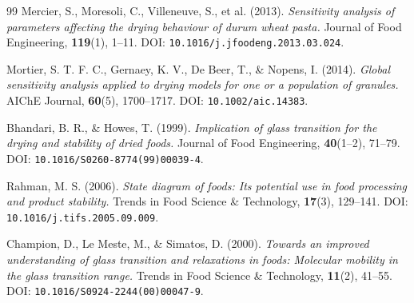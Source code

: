 \begin{thebibliography}{99}
 Mercier, S., Moresoli, C., Villeneuve, S., et al. (2013).
\emph{Sensitivity analysis of parameters affecting the drying behaviour of
durum wheat pasta.} Journal of Food Engineering, \textbf{119}(1), 1--11.
DOI: \texttt{10.1016/j.jfoodeng.2013.03.024}.

 Mortier, S. T. F. C., Gernaey, K. V., De Beer, T., \&
Nopens, I. (2014).
\emph{Global sensitivity analysis applied to drying models for one or a
population of granules.} AIChE Journal, \textbf{60}(5), 1700--1717.
DOI: \texttt{10.1002/aic.14383}.

 Bhandari, B. R., \& Howes, T. (1999).
\emph{Implication of glass transition for the drying and stability of dried
foods.} Journal of Food Engineering, \textbf{40}(1--2), 71--79.
DOI: \texttt{10.1016/S0260-8774(99)00039-4}.

 Rahman, M. S. (2006).
\emph{State diagram of foods: Its potential use in food processing and product
stability.} Trends in Food Science \& Technology, \textbf{17}(3), 129--141.
DOI: \texttt{10.1016/j.tifs.2005.09.009}.

 Champion, D., Le Meste, M., \& Simatos, D. (2000).
\emph{Towards an improved understanding of glass transition and relaxations in
foods: Molecular mobility in the glass transition range.}
Trends in Food Science \& Technology, \textbf{11}(2), 41--55.
DOI: \texttt{10.1016/S0924-2244(00)00047-9}.

\end{thebibliography}

\vspace{8pt}
\label{sec:refnote}
